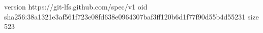 version https://git-lfs.github.com/spec/v1
oid sha256:38a1321e3af561f723e08fd638e0964307baf3ff120b6d1f77f90d55b4d55231
size 523
